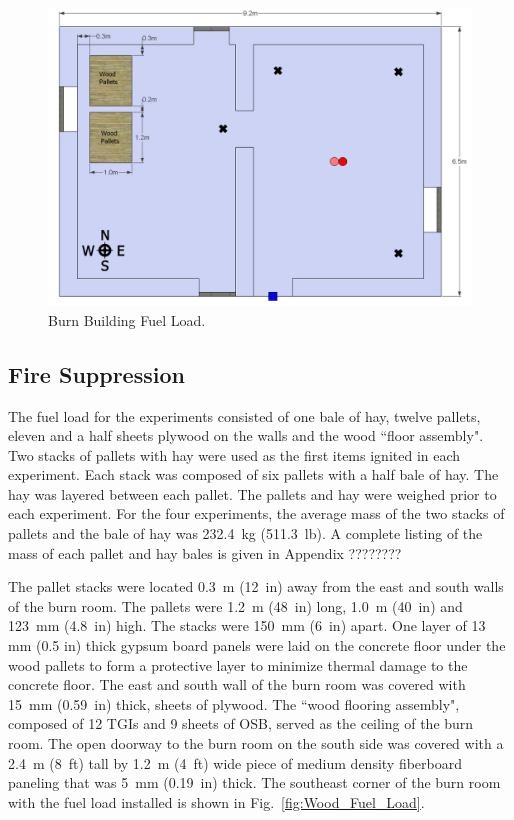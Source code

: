 \documentclass[12pt,oneside]{book}
\begin{document}
\begin{figure}[!ht]
	\includegraphics[width=6in]{../Figures/Pictures/DelCoBurnBuildingFuelLoad}
	\caption{Burn Building Fuel Load.}
	\label{fig:Burn_Building_Fuel_Load}
\end{figure}


\subsection{Fire Suppression}
\label{sec:Fuel_Load_Wood_Experiments}

The fuel load for the experiments consisted of one bale of hay, twelve pallets, eleven and a half sheets plywood on the walls and the wood ``floor assembly". Two stacks of pallets with hay were used as the first items ignited in each experiment.  Each stack was composed of six pallets with a half bale of hay.  The hay was layered between each pallet.  The pallets and hay were weighed prior to each experiment.  For the four experiments, the average mass of the two stacks of pallets and the bale of hay was 232.4~kg (511.3~lb).  A complete listing of the mass of each pallet and hay bales is given in Appendix ????????

The pallet stacks were located 0.3~m (12~in) away from the east and south walls of the burn room.  The pallets were 1.2~m (48~in) long, 1.0~m (40~in) and 123~mm (4.8~in) high.  The stacks were 150~mm (6~in) apart.  One layer of 13 mm (0.5 in) thick gypsum board panels were laid on the concrete floor under the wood pallets to form a protective layer to minimize thermal damage to the concrete floor.
The east and south wall of the burn room was covered with 15~mm (0.59~in) thick, sheets of plywood.  The ``wood flooring assembly", composed of 12 TGIs and 9 sheets of OSB, served as the ceiling of the burn room.  The open doorway to the burn room on the south side was covered with a 2.4~m (8~ft) tall by 1.2~m (4~ft) wide piece of medium density fiberboard paneling that was 5~mm (0.19~in) thick.  The southeast corner of the burn room with the fuel load installed is shown in Fig.~\ref{fig:Wood_Fuel_Load}.
\end{document}
